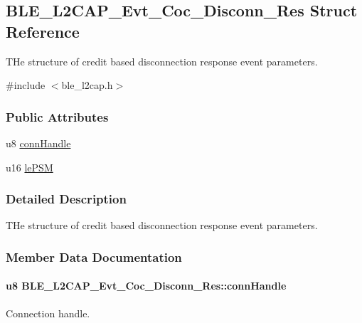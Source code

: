 \hypertarget{struct_b_l_e___l2_c_a_p___evt___coc___disconn___res}{}\subsection{B\+L\+E\+\_\+\+L2\+C\+A\+P\+\_\+\+Evt\+\_\+\+Coc\+\_\+\+Disconn\+\_\+\+Res Struct Reference}
\label{struct_b_l_e___l2_c_a_p___evt___coc___disconn___res}


T\+He structure of credit based disconnection response event parameters.  




{\ttfamily \#include $<$ble\+\_\+l2cap.\+h$>$}

\subsubsection*{Public Attributes}
\begin{DoxyCompactItemize}
\item 
u8 \hyperlink{struct_b_l_e___l2_c_a_p___evt___coc___disconn___res_ab34cbb47e5d810dc92983242518ca78f}{conn\+Handle}
\item 
u16 \hyperlink{struct_b_l_e___l2_c_a_p___evt___coc___disconn___res_a6cc42e549d86745abbea6ba1667532d2}{le\+P\+SM}
\end{DoxyCompactItemize}


\subsubsection{Detailed Description}
T\+He structure of credit based disconnection response event parameters. 

\subsubsection{Member Data Documentation}
\paragraph[{\texorpdfstring{conn\+Handle}{connHandle}}]{\setlength{\rightskip}{0pt plus 5cm}u8 B\+L\+E\+\_\+\+L2\+C\+A\+P\+\_\+\+Evt\+\_\+\+Coc\+\_\+\+Disconn\+\_\+\+Res\+::conn\+Handle}\hypertarget{struct_b_l_e___l2_c_a_p___evt___coc___disconn___res_ab34cbb47e5d810dc92983242518ca78f}{}\label{struct_b_l_e___l2_c_a_p___evt___coc___disconn___res_ab34cbb47e5d810dc92983242518ca78f}
Connection handle. 
